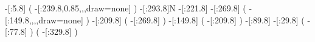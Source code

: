 {                  -[:5.8]%
                            (
    -[:239.8,0.85,,,draw=none]%
                            )
                -[:293.8]N%
                -[:221.8]%
                -[:269.8]%
                            (
       -[:149.8,,,,draw=none]%
                            )
                -[:209.8]%
                            (
                    -[:269.8]%
                            )
                -[:149.8]%
                            (
                    -[:209.8]%
                            )
                 -[:89.8]%
                 -[:29.8]%
                            (
                     -[:77.8]\phantom{N}%
                            )
                            (
                    -[:329.8]%
                            )
}
